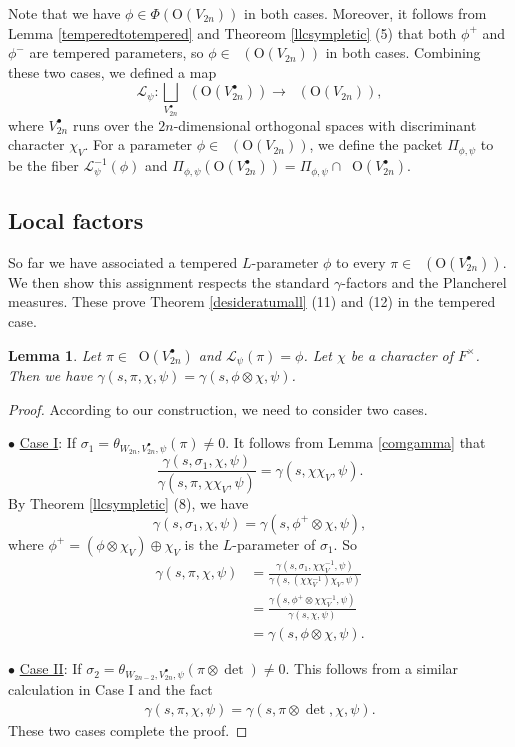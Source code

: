 \documentclass[article]{article}
\numberwithin{equation}{section}
\newtheorem{lemma}[theorem]{Lemma}
\theoremstyle{definition}
\DeclareMathOperator{\Irrt}{Irr_{temp}}
\DeclareMathOperator{\Para}{\Phi_{temp}}
\begin{document}
Note that we have $\phi\in \Phi(\mathrm O(V_{2n}))$ in both cases. Moreover, it follows from Lemma \ref{temperedtotempered} and Theoreom \ref{llcsympletic} (5) that both $\phi^+$ and $\phi^-$ are tempered parameters, so $\phi\in \Para(\mathrm O(V_{2n}))$ in both cases. Combining these two cases, we defined a map
$$
\mathcal L_{\psi}: \bigsqcup_{V_{2n}^{\bullet}} \Irrt \left(\mathrm O(V_{2n}^\bullet)\right) \longrightarrow \Para(\mathrm O(V_{2n})),$$
where $V_{2n}^{\bullet}$ runs over the $2n$-dimensional orthogonal spaces with discriminant character $\chi_V$. For a parameter $\phi\in \Para(\mathrm O(V_{2n})) $, we define the packet $\Pi_{\phi,\psi}$ to be the fiber $\mathcal L_{\psi}^{-1}(\phi)$ and $\Pi_{\phi,\psi}(\mathrm O(V_{2n}^{\bullet}))= \Pi_{\phi,\psi}\cap \Irrt \mathrm O(V_{2n}^{\bullet})$.




\subsection{Local factors}
So far we have associated a tempered $L$-parameter $\phi$ to every  $\pi\in \Irrt(\mathrm O(V^\bullet_{2n}))$. We then show this assignment respects the standard $\gamma$-factors and the Plancherel measures. These prove Theorem \ref{desideratumall} (11) and (12) in the tempered case. 


\begin{lemma}\label{respectgamma}
	Let $\pi\in \Irrt \mathrm O(V^\bullet_{2n})$ and $\mathcal L_{\psi}(\pi)=\phi$. Let $\chi$ be a character of $F^{\times}$. Then we have $\gamma(s,\pi, \chi,\psi)=\gamma(s,\phi\otimes \chi, \psi)$. 
\end{lemma}
\begin{proof}
According to our construction, we need to consider two cases. 

$\bullet$ \underline{Case I}: If $\sigma_1=\theta_{W_{2n}, V^\bullet_{2n}, \psi}(\pi)\neq 0$. It follows from Lemma \ref{comgamma} that  
$$
\frac{\gamma(s,\sigma_1,\chi,\psi)}{\gamma(s,\pi,\chi\chi_V,\psi)}= \gamma(s,\chi\chi_V,\psi).
$$
By Theorem \ref{llcsympletic} (8), we have 
$$
\gamma(s,\sigma_1,\chi,\psi)=\gamma(s,\phi^+\otimes \chi ,\psi),
$$
where $\phi^+=(\phi\otimes\chi_{V})\oplus \chi_{V}$ is the $L$-parameter of $\sigma_1$. So 
\begin{align*}
\gamma(s,\pi,\chi,\psi)&=\frac{\gamma(s,\sigma_1,\chi\chi_{V}^{-1},\psi)}{\gamma(s,(\chi\chi_{V}^{-1})\chi_V,\psi)}\\
&=\frac{\gamma(s,\phi^+\otimes\chi \chi_{V}^{-1} ,\psi)}{\gamma(s,\chi,\psi)}\\
&=\gamma(s,\phi \otimes\chi ,\psi).
\end{align*}

$\bullet$ \underline{Case II}: If $\sigma_2=\theta_{W_{2n-2}, V^\bullet_{2n}, \psi}(\pi\otimes \det)\neq 0 $. This follows from a similar calculation in Case I and the fact 
\begin{align*}
\gamma(s,\pi, \chi,\psi)= \gamma(s,\pi\otimes\det, \chi,\psi).
\end{align*}
These two cases complete the proof.  
\end{proof}
\end{document}
